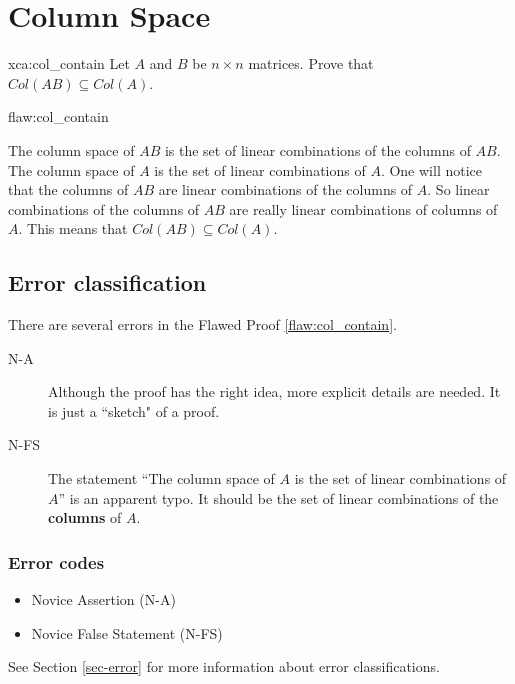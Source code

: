\section{Column Space}

\begin{xca}{xca:col_contain}
Let $A$ and $B$ be $n\times n$ matrices. Prove that $Col(AB) \subseteq Col(A)$.
\end{xca}

\begin{flaw}{flaw:col_contain} %

The column space of $AB$ is the set of linear combinations of the columns of $AB$. The column space of $A$ is the set of linear combinations of $A$. One will notice that the columns of $AB$ are linear combinations of the columns of $A$. So linear combinations of the columns of $AB$ are really linear combinations of columns of $A$. This means that $Col(AB) \subseteq Col(A)$.
\end{flaw}

\clearpage
\subsection{Error classification}


There are several errors
 in the Flawed Proof \ref{flaw:col_contain}.
 \begin{description}
    \item[N-A] Although the proof has the right idea, more explicit details are needed. It is just a ``sketch" of a proof.
 	\item[N-FS] The statement ``The column space of $A$ is the set of linear combinations of $A$'' is an apparent typo. It should be the set of linear combinations of the \textbf{columns} of $A$.
 \end{description}


\subsubsection{Error codes}
\begin{itemize}
	\item Novice Assertion (N-A)
\item Novice False Statement (N-FS)
\end{itemize}
See Section \ref{sec-error} for more information about error classifications.

